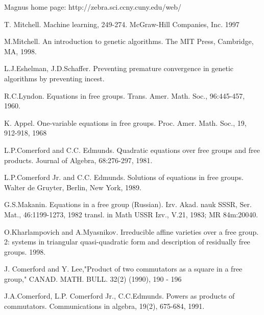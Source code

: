 \documentclass{article}
\begin{document}
\begin{thebibliography}{99}

 Magnus home page: http://zebra.sci.ccny.cuny.edu/web/

 T. Mitchell. Machine learning, 249-274. McGraw-Hill
Companies, Inc. 1997

 M.Mitchell. An introduction to genetic algorithms. The
MIT Press, Cambridge, MA, 1998.

 L.J.Eshelman, J.D.Schaffer. Preventing premature
convergence in genetic algorithms by preventing incest. 

 R.C.Lyndon. Equations in free groups.
Trans. Amer. Math. Soc., 96:445-457, 1960.

 K. Appel. One-variable equations in free
groups. Proc. Amer. Math. Soc., 19, 912-918, 1968

 L.P.Comerford and C.C. Edmunds. Quadratic equations over free groups and free products. Journal of Algebra, 68:276-297, 1981.

 L.P.Comerford Jr. and C.C. Edmunds. Solutions of
equations in free groups. Walter de Gruyter, Berlin, New York, 1989.

 G.S.Makanin. Equations in a free group
(Russian). Izv. Akad. nauk SSSR, Ser. Mat., 46:1199-1273, 1982
transl. in Math USSR Izv., V.21, 1983; MR 84m:20040.

 O.Kharlampovich and A.Myasnikov. Irreducible affine
varieties over a free group. 2: systems in triangular quasi-quadratic
form and description of residually free groups. 1998.

  J. Comerford and Y. Lee,"Product of two
commutators as a square in a free group," CANAD. MATH. BULL. 32(2)
(1990), 190 - 196

 J.A.Comerford, L.P. Comerford Jr., C.C.Edmunds. Powers
as products of commutators. Communications in algebra, 19(2), 675-684,
1991.

\end{thebibliography}
\end{document}
